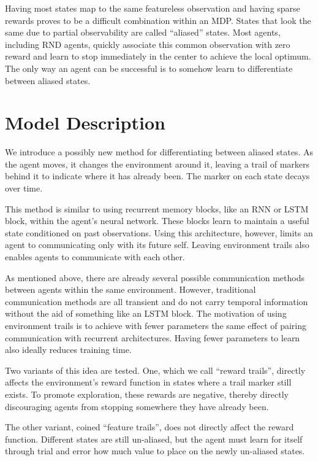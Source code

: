 \documentclass[12pt,journal,compsoc]{IEEEtran}
\begin{document}
	Having most states map to the same featureless observation and having sparse rewards proves to be a difficult combination within an MDP. States that look the same due to partial observability are called ``aliased'' states. Most agents, including RND agents, quickly associate this common observation with zero reward and learn to stop immediately in the center to achieve the local optimum. The only way an agent can be successful is to somehow learn to differentiate between aliased states.
	
	\section{Model Description}
	We introduce a possibly new method for differentiating between aliased states. As the agent moves, it changes the environment around it, leaving a trail of markers behind it to indicate where it has already been. The marker on each state decays over time. 
	
	This method is similar to using recurrent memory blocks, like an RNN or LSTM \cite{lstm} block, within the agent's neural network. These blocks learn to maintain a useful state conditioned on past observations. Using this architecture, however, limits an agent to communicating only with its future self. Leaving environment trails also enables agents to communicate with each other. 
	
	As mentioned above, there are already several possible communication methods between agents within the same environment. However, traditional communication methods are all transient and do not carry temporal information without the aid of something like an LSTM block. The motivation of using environment trails is to achieve with fewer parameters the same effect of pairing communication with recurrent architectures. Having fewer parameters to learn also ideally reduces training time. 
	
	Two variants of this idea are tested. One, which we call ``reward trails'', directly affects the environment's reward function in states where a trail marker still exists. To promote exploration, these rewards are negative, thereby directly discouraging agents from stopping somewhere they have already been.
	
	The other variant, coined ``feature trails'', does not directly affect the reward function. Different states are still un-aliased, but the agent must learn for itself through trial and error how much value to place on the newly un-aliased states. 
	
\end{document}
